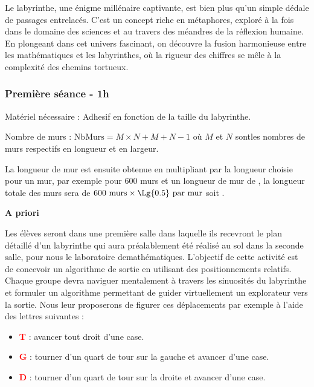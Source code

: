 Le labyrinthe, une énigme millénaire captivante, est bien plus qu'un simple dédale de passages entrelacés.
C'est un concept riche en métaphores, exploré à la fois dans le domaine des sciences et au travers des méandres de la réflexion humaine.
En plongeant dans cet univers fascinant, on découvre la fusion harmonieuse entre les mathématiques et les labyrinthes, où la rigueur
des chiffres se mêle à la complexité des chemins tortueux.
\subsubsection*{Première séance - 1h}
Matériel nécessaire : Adhesif en fonction de la taille du labyrinthe.

Nombre de murs : $\text{NbMurs} = M\times N + M + N - 1$ où $M$ et $N$ sontles nombres de murs respectifs en longueur et en largeur.

La longueur de mur est ensuite obtenue en multipliant par la longueur choisie pour un mur, par exemple pour 600 murs et un longueur
de mur de , la longueur totale des murs sera de $600 \text{ murs}\times \Lg{0.5} \text{ par mur}$ soit .


\textbf{A priori}

Les élèves seront dans une première salle dans laquelle ils recevront le plan détaillé d'un labyrinthe qui aura préalablement été réalisé au sol dans la seconde salle, pour nous le laboratoire demathématiques.
L'objectif de cette activité est de concevoir un algorithme de sortie en utilisant des positionnements relatifs.
Chaque groupe devra naviguer mentalement à travers les sinuosités du labyrinthe et formuler un algorithme permettant de guider virtuellement un explorateur vers la sortie.
Nous leur proposerons de figurer ces déplacements par exemple à l'aide des lettres suivantes :
\begin{itemize}
    \item \textbf{\textcolor{red}{T}} : avancer tout droit d'une case.
    \item \textbf{\textcolor{red}{G}} : tourner d'un quart de tour sur la gauche et avancer d'une case.
    \item \textbf{\textcolor{red}{D}} : tourner d'un quart de tour sur la droite et avancer d'une case.
\end{itemize}

